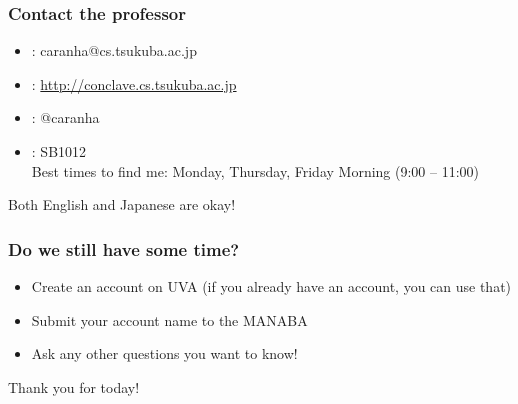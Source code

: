 \documentclass{beamer}
\begin{document}
\begin{frame}
  \frametitle{Contact the professor}
  \begin{itemize}
  \item {}: caranha@cs.tsukuba.ac.jp
  \item {}: \url{http://conclave.cs.tsukuba.ac.jp}
  \item {}: @caranha

    \bigskip

  \item {}: SB1012\\
    Best times to find me: Monday, Thursday, Friday Morning (9:00 -- 11:00)
  \end{itemize}

  \bigskip

  Both English and Japanese are okay!
\end{frame}



\begin{frame}
  \frametitle{Do we still have some time?}

  \begin{itemize}
  \item Create an account on UVA (if you already have an account, you can use that)

    \bigskip

  \item Submit your account name to the MANABA

    \bigskip

  \item Ask any other questions you want to know!
  \end{itemize}

  \bigskip

  \begin{center}
    Thank you for today!
  \end{center}
\end{frame}
\end{document}
